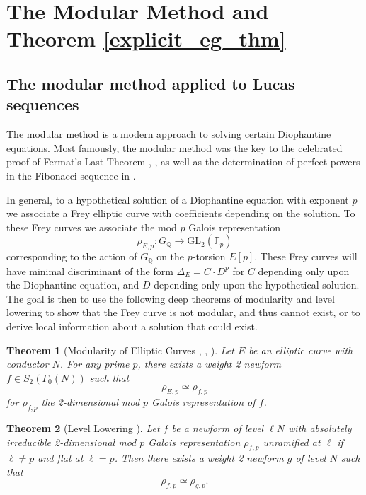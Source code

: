 \documentclass[12pt]{amsart}
\newtheorem{thm}{Theorem}[section]
\theoremstyle{definition}
\theoremstyle{remark}
\def\F{{\mathbb F}}
\def\Q{{\mathbb Q}}
\newcommand{\GL}{\text{GL}}
\begin{document}
\section{The Modular Method and Theorem \ref{explicit_eg_thm}}\label{mod_method}

\subsection{The modular method applied to Lucas sequences}

The modular method is a modern approach to solving certain Diophantine equations.  Most famously, the modular method was the key to the celebrated proof of Fermat's Last Theorem \cite{wiles95}, \cite{taylorwiles95}, as well as the determination of perfect powers in the Fibonacci sequence in \cite{siksek06}.

In general, to a hypothetical solution of a Diophantine equation with exponent $p$ we associate a Frey elliptic curve with coefficients depending on the solution.  To these Frey curves we associate the mod $p$ Galois representation
\begin{equation} \rho_{E,p} \colon G_{\Q} \rightarrow \GL_2(\F_p) \end{equation}
corresponding to the action of $G_\Q$ on the $p$-torsion $E[p]$.  These Frey curves will have minimal discriminant of the form $\Delta_E = C \cdot D^p$ for $C$ depending only upon the Diophantine equation, and $D$ depending only upon the hypothetical solution.  The goal is then to use the following deep theorems of modularity and level lowering to show that the Frey curve is not modular, and thus cannot exist, or to derive local information about a solution that could exist. 

\begin{thm}[Modularity of Elliptic Curves \cite{wiles95}, \cite{taylorwiles95}, \cite{conrad01}]\label{modularity}
Let $E$ be an elliptic curve with conductor $N$.  For any prime $p$, there exists a weight 2 newform $f \in S_2(\Gamma_0(N))$ such that
\[ \rho_{E,p} \simeq \rho_{f,p} \]
for $\rho_{f,p}$ the 2-dimensional mod $p$ Galois representation of $f$.\end{thm}

\begin{thm}[Level Lowering \cite{ribet91}]\label{levellow}
Let $f$ be a newform of level $\ell N$ with absolutely irreducible 2-dimensional mod $p$ Galois representation $\rho_{f,p}$ unramified at $\ell$ if $\ell \neq p$ and flat at $\ell = p$.  Then there exists a weight 2 newform $g$ of level $N$ such that
\[ \rho_{f,p} \simeq \rho_{g,p}. \]
\end{thm}
\end{document}
